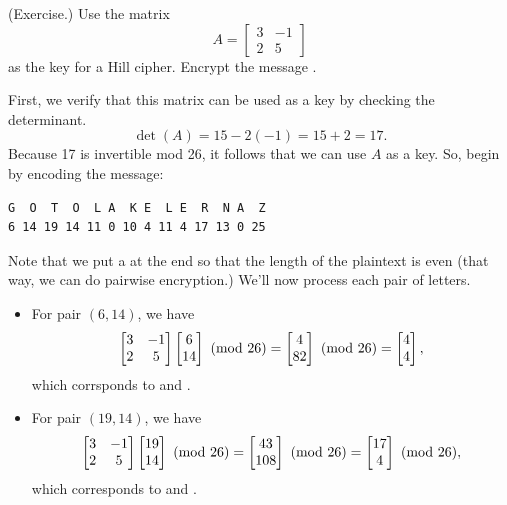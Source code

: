 \documentclass[letterpaper]{article}
\begin{document}
\begin{mdframed}
    (Exercise.) Use the matrix \[A = \begin{bmatrix}
        3 & -1 \\ 2 & 5
    \end{bmatrix}\] as the key for a Hill cipher. Encrypt the message .

    \begin{mdframed}
        First, we verify that this matrix can be used as a key by checking the determinant.
        \[\det(A) = 15 - 2(-1) = 15 + 2 = 17.\]
        Because 17 is invertible mod 26, it follows that we can use $A$ as a key. So, begin by encoding the message: 
        \begin{mdframed}
            \begin{verbatim}
G  O  T  O  L A  K E  L E  R  N A  Z
6 14 19 14 11 0 10 4 11 4 17 13 0 25\end{verbatim}
        \end{mdframed}
        Note that we put a  at the end so that the length of the plaintext is even (that way, we can do pairwise encryption.) We'll now process each pair of letters. 
        \begin{itemize}
            \item For pair $(6, 14)$, we have 
            \[\begin{bmatrix}
                3 & -1 \\ 2 & 5
            \end{bmatrix} \begin{bmatrix}
                6 \\ 14
            \end{bmatrix} \ (\mathrm{mod}\ 26) = \begin{bmatrix}
                4 \\ 82 
            \end{bmatrix} \ (\mathrm{mod}\ 26) = \begin{bmatrix}
                4 \\ 4
            \end{bmatrix},\]
            which corrsponds to  and .

            \item For pair $(19, 14)$, we have 
            \[\begin{bmatrix}
                3 & -1 \\ 2 & 5
            \end{bmatrix} \begin{bmatrix}
                19 \\ 14
            \end{bmatrix} \ (\mathrm{mod}\ 26) = \begin{bmatrix}
                43 \\ 108
            \end{bmatrix} \ (\mathrm{mod}\ 26) = \begin{bmatrix}
                17 \\ 4
            \end{bmatrix} \ (\mathrm{mod}\ 26),\]
            which corresponds to  and .


\end{itemize}
\end{mdframed}
\end{mdframed}
\end{document}
